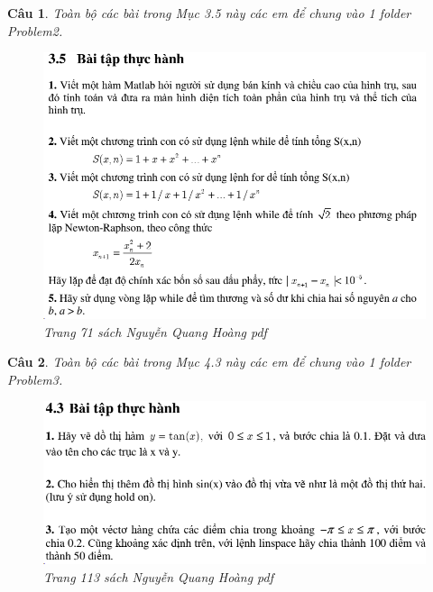 \documentclass[11pt]{article}
\newtheorem{bt}{Câu}
\begin{document}
\begin{bt}\label{Problem 2}
Toàn bộ các bài trong Mục 3.5 này các em để chung vào 1 folder Problem2. \\
%	
\begin{figure}[h!]
	\centering
	\includegraphics[width=0.75\linewidth]{K65_2}
	\caption{Trang 71 sách Nguyễn Quang Hoàng pdf}
	\label{fig:k652}
\end{figure}
\end{bt}


\begin{bt}\label{Problem 3}
Toàn bộ các bài trong Mục 4.3 này các em để chung vào 1 folder Problem3. \\
%	
\begin{figure}[h!]
	\centering
	\includegraphics[width=0.75\linewidth]{K65_3}
	\caption{Trang 113 sách Nguyễn Quang Hoàng pdf}
	\label{fig:k653}
\end{figure}
\end{bt}

\newpage 
\end{document}
